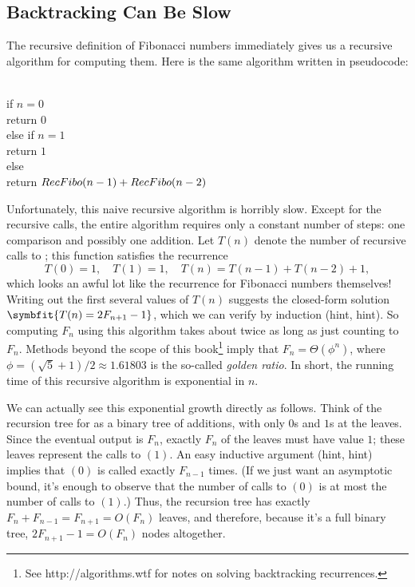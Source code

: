 \subsection{Backtracking Can Be Slow}

The recursive definition of Fibonacci numbers immediately gives us a recursive algorithm for computing them.
Here is the same algorithm written in pseudocode:

\begin{pseudocode}
\\
if $n = 0$\\
\Indent return $0$\\
else if $n = 1$\\
\Indent return $1$\\
else\\
\Indent return $RecFibo(n-1) + RecFibo(n-2)$
\end{pseudocode}

Unfortunately, this naive recursive algorithm is horribly slow.
Except for the recursive calls, the entire algorithm requires only a constant number of steps: one comparison and possibly one addition.
Let $T(n)$ denote the number of recursive calls to ; this function satisfies the recurrence
\[
T(0) = 1, \quad T(1) = 1, \quad T(n) = T(n-1) + T(n-2) + 1,
\]
which looks an awful lot like the recurrence for Fibonacci numbers themselves!
Writing out the first several values of $T(n)$ suggests the closed-form solution $\symbfit{T(n) = 2F_{n+1} - 1}$, which we can verify by induction (hint, hint).
So computing $F_n$ using this algorithm takes about twice as long as just counting to $F_n$.
Methods beyond the scope of this book\footnote{See http://algorithms.wtf for notes on solving backtracking recurrences.} imply that $F_n = \Theta(\phi^n)$, where $\phi = (\sqrt{5} + 1)/2 \approx 1.61803$ is the so-called \textit{golden ratio}.
In short, the running time of this recursive algorithm is exponential in $n$.

We can actually see this exponential growth directly as follows.
Think of the recursion tree for  as a binary tree of additions, with only $0$s and $1$s at the leaves.
Since the eventual output is $F_n$, exactly $F_n$ of the leaves must have value $1$; these leaves represent the calls to $(1)$.
An easy inductive argument (hint, hint) implies that $(0)$ is called exactly $F_{n-1}$ times.
(If we just want an asymptotic bound, it’s enough to observe that the number of calls to $(0)$ is at most the number of calls to $(1)$.)
Thus, the recursion tree has exactly $F_n + F_{n-1} = F_{n+1} = O(F_n)$ leaves, and therefore, because it’s a full binary tree, $2F_{n+1} - 1 = O(F_n)$ nodes altogether.

